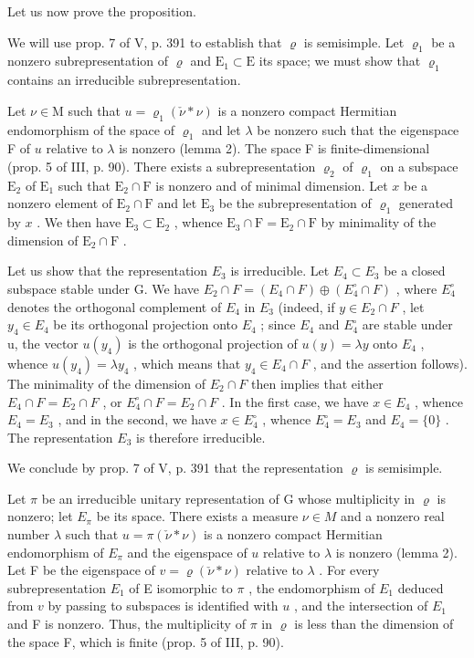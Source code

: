 Let us now prove the proposition.

We will use prop. 7 of V, p. 391 to establish that \(\varrho\) is semisimple. Let \(\varrho_{1}\) be a nonzero subrepresentation of \(\varrho\) and \(\mathrm{E}_{1} \subset \mathrm{E}\) its space; we must show that \(\varrho_{1}\) contains an irreducible subrepresentation.

Let \(\nu \in \mathrm{M}\) such that \(u = \varrho_{1}(\check{\nu}*\nu)\) is a nonzero compact Hermitian endomorphism of the space of \(\varrho_{1}\) and let \(\lambda\) be nonzero such that the eigenspace F of \(u\) relative to \(\lambda\) is nonzero (lemma 2). The space F is finite-dimensional (prop. 5 of III, p. 90). There exists a subrepresentation \(\varrho_{2}\) of \(\varrho_{1}\) on a subspace \(\mathrm{E}_{2}\) of \(\mathrm{E}_{1}\) such that \(\mathrm{E}_{2} \cap \mathrm{F}\) is nonzero and of minimal dimension. Let \(x\) be a nonzero element of \(\mathrm{E}_{2} \cap \mathrm{F}\) and let \(\mathrm{E}_{3}\) be the subrepresentation of \(\varrho_{1}\) generated by \(x\) . We then have \(\mathrm{E}_{3} \subset \mathrm{E}_{2}\) , whence \(\mathrm{E}_{3} \cap \mathrm{F} = \mathrm{E}_{2} \cap \mathrm{F}\) by minimality of the dimension of \(\mathrm{E}_{2} \cap \mathrm{F}\) .

Let us show that the representation \(E_{3}\) is irreducible. Let \(E_{4} \subset E_{3}\) be a closed subspace stable under G. We have \(E_{2} \cap F = (E_{4} \cap F) \oplus (E_{4}^{\circ} \cap F)\) , where \(E_{4}^{\circ}\) denotes the orthogonal complement of \(E_{4}\) in \(E_{3}\) (indeed, if \(y \in E_{2} \cap F\) , let \(y_{4} \in E_{4}\) be its orthogonal projection onto \(E_{4}\) ; since \(E_{4}\) and \(E_{4}^{\circ}\) are stable under u, the vector \(u(y_{4})\) is the orthogonal projection of \(u(y) = \lambda y\) onto \(E_{4}\) , whence \(u(y_{4}) = \lambda y_{4}\) , which means that \(y_{4} \in E_{4} \cap F\) , and the assertion follows). The minimality of the dimension of \(E_{2} \cap F\) then implies that either \(E_{4} \cap F = E_{2} \cap F\) , or \(E_{4}^{\circ} \cap F = E_{2} \cap F\) . In the first case, we have \(x \in E_{4}\) , whence \(E_{4} = E_{3}\) , and in the second, we have \(x \in E_{4}^{\circ}\) , whence \(E_{4}^{\circ} = E_{3}\) and \(E_{4} = \{0\}\) . The representation \(E_{3}\) is therefore irreducible.

We conclude by prop. 7 of V, p. 391 that the representation \(\varrho\) is semisimple.

Let \(\pi\) be an irreducible unitary representation of G whose multiplicity in \(\varrho\) is nonzero; let \(E_{\pi}\) be its space. There exists a measure \(\nu \in M\) and a nonzero real number \(\lambda\) such that \(u = \pi (\check{\nu} * \nu)\) is a nonzero compact Hermitian endomorphism of \(E_{\pi}\) and the eigenspace of \(u\) relative to \(\lambda\) is nonzero (lemma 2). Let F be the eigenspace of \(v = \varrho (\check{\nu} * \nu)\) relative to \(\lambda\) . For every subrepresentation \(E_1\) of E isomorphic to \(\pi\) , the endomorphism of \(E_1\) deduced from \(v\) by passing to subspaces is identified with \(u\) , and the intersection of \(E_1\) and F is nonzero. Thus, the multiplicity of \(\pi\) in \(\varrho\) is less than the dimension of the space F, which is finite (prop. 5 of III, p. 90).

